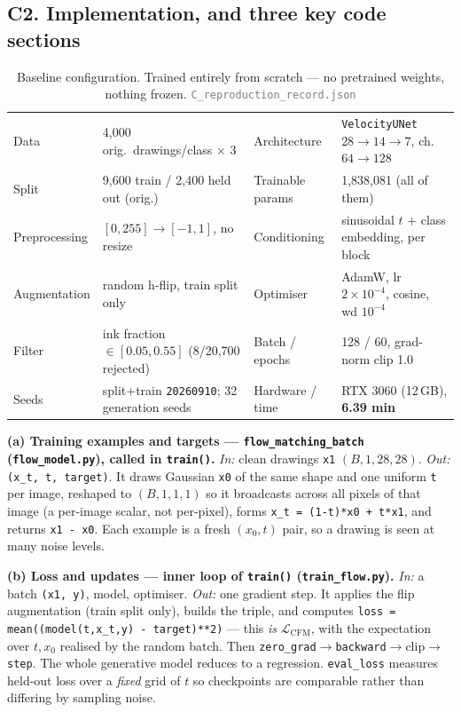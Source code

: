 \documentclass[10pt,a4paper]{article}
\begin{document}
\subsection{C2. Implementation, and three key code sections}

\begin{table}[H]\centering\small
\caption{Baseline configuration. Trained entirely from scratch --- no pretrained weights, nothing
frozen. \textcolor{gray}{\small\texttt{C\_reproduction\_record.json}}}
\label{tab:Cconf}
\begin{tabular}{@{}llll@{}}
\toprule
Data & 4{,}000 orig.\ drawings/class $\times$ 3 & Architecture & \texttt{VelocityUNet} $28{\to}14{\to}7$, ch.\ $64{\to}128$ \\
Split & 9{,}600 train / 2{,}400 held out (orig.) & Trainable params & 1{,}838{,}081 (all of them) \\
Preprocessing & $[0,255]\!\to\![-1,1]$, no resize & Conditioning & sinusoidal $t$ + class embedding, per block \\
Augmentation & random h-flip, train split only & Optimiser & AdamW, lr $2\!\times\!10^{-4}$, cosine, wd $10^{-4}$ \\
Filter & ink fraction $\in[0.05,0.55]$ (8/20{,}700 rejected) & Batch / epochs & 128 / 60, grad-norm clip 1.0 \\
Seeds & split+train \texttt{20260910}; 32 generation seeds & Hardware / time & RTX 3060 (12\,GB), \textbf{6.39 min} \\
\bottomrule
\end{tabular}
\end{table}

\textbf{(a) Training examples and targets --- \texttt{flow\_matching\_batch} (\texttt{flow\_model.py}),
called in \texttt{train()}.} \emph{In:} clean drawings \texttt{x1} $(B,1,28,28)$. \emph{Out:}
\texttt{(x\_t, t, target)}. It draws Gaussian \texttt{x0} of the same shape and one uniform \texttt{t}
per image, reshaped to $(B,1,1,1)$ so it broadcasts across all pixels of that image (a per-image
scalar, not per-pixel), forms \texttt{x\_t = (1-t)*x0 + t*x1}, and returns \texttt{x1 - x0}. Each
example is a fresh $(x_0,t)$ pair, so a drawing is seen at many noise levels.

\textbf{(b) Loss and updates --- inner loop of \texttt{train()} (\texttt{train\_flow.py}).}
\emph{In:} a batch \texttt{(x1, y)}, model, optimiser. \emph{Out:} one gradient step. It applies the
flip augmentation (train split only), builds the triple, and computes
\texttt{loss = mean((model(t,x\_t,y) - target)**2)} --- this \emph{is} $\mathcal{L}_{\text{CFM}}$, with
the expectation over $t,x_0$ realised by the random batch. Then
\texttt{zero\_grad}$\to$\texttt{backward}$\to$clip$\to$\texttt{step}. The whole generative model
reduces to a regression. \texttt{eval\_loss} measures held-out loss over a \emph{fixed} grid of $t$ so
checkpoints are comparable rather than differing by sampling noise.
\end{document}
